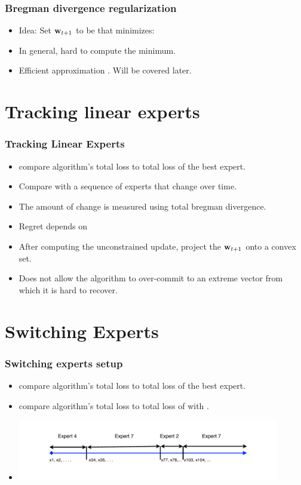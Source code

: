 \documentclass[handout]{beamer}
\begin{document}
\begin{frame}
\frametitle{Bregman divergence regularization}
\begin{itemize}
\item Idea: Set ${\mathbf w}_{t+1}$ to be  \R{$\vu$} that minimizes:
\item In general, hard to compute the minimum.
\item Efficient approximation . Will be covered later.
\end{itemize}
\end{frame}

\section{Tracking linear experts}
\begin{frame}
\frametitle{Tracking Linear Experts }
\begin{itemize}
\item {} compare algorithm's total loss to total
  loss of the best expert.
\item {} Compare with a sequence of experts that
  change over time.
\item The amount of change is measured using total bregman
  divergence.
\item Regret depends on 
\item {} After computing the unconstrained
  update, project the ${\mathbf w}_{t+1}$ onto a convex set.
\item Does not allow the algorithm to over-commit to an extreme vector
  from which it is hard to recover.
\end{itemize}
\end{frame}


\section{Switching Experts}

\begin{frame}
\frametitle{Switching experts setup}
\begin{itemize}
\item {} compare algorithm's total loss to total
  loss of the best expert.
\item {} compare algorithm's total loss to total
  loss of  with  .
\item
\includegraphics[width=4.5in]{figures/SwitchingExperts.pdf}
\end{itemize}
\end{frame}
\end{document}
